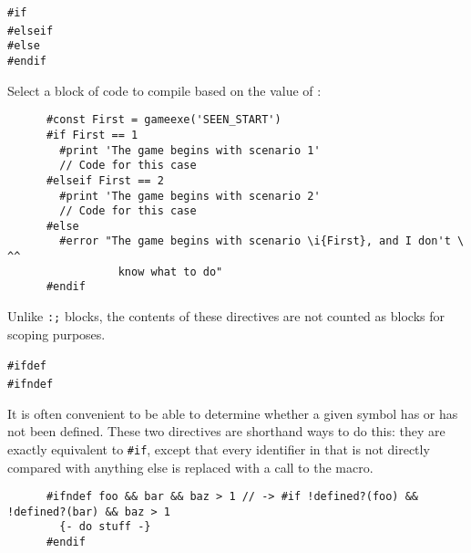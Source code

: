     \lstinline|#if|~\\
    \lstinline|#elseif|~\\
    \lstinline|#else|\\
    \lstinline|#endif|
    \begin{cmdesc}
      Select a block of code to compile based on the value of :

      \begin{lstlisting}
      #const First = gameexe('SEEN_START')
      #if First == 1
        #print 'The game begins with scenario 1'
        // Code for this case
      #elseif First == 2
        #print 'The game begins with scenario 2'
        // Code for this case
      #else
        #error "The game begins with scenario \i{First}, and I don't \ ^^
                 know what to do"
      #endif
      \end{lstlisting}

      Unlike \lstinline|:;| blocks, the contents of these directives are not
      counted as blocks for scoping purposes.
    \end{cmdesc}

    \lstinline|#ifdef|~\\
    \lstinline|#ifndef|~\metavar{EXPR}
    \begin{cmdesc}
      It is often convenient to be able to determine whether a given symbol has
      or has not been defined.  These two directives are shorthand ways to do
      this: they are exactly equivalent to \lstinline|#if|, except that every
      identifier in \metavar{EXPR} that is not directly compared with anything
      else is replaced with a call to the \fnref{defined?} macro.

      \begin{lstlisting}
      #ifndef foo && bar && baz > 1 // -> #if !defined?(foo) && !defined?(bar) && baz > 1
        {- do stuff -}
      #endif
      \end{lstlisting}
    \end{cmdesc}


